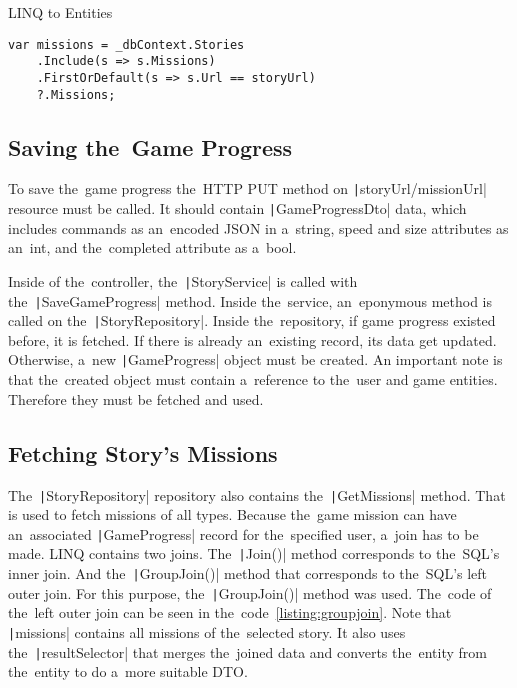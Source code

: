 \begin{listing}
    \caption{LINQ to Entities}
    \label{listing:linq}
    \begin{verbatim}
var missions = _dbContext.Stories
    .Include(s => s.Missions)
    .FirstOrDefault(s => s.Url == storyUrl)
    ?.Missions;
    \end{verbatim}
\end{listing}

\subsection{Saving the~Game Progress}

To save the~game progress the~HTTP PUT method on \linebreak\texttt|{storyUrl}/{missionUrl}| resource must be called.
It should contain \linebreak\texttt|GameProgressDto| data, which includes commands as an~encoded JSON in a~string, speed and size attributes as an~int, and the~completed attribute as a~bool.

Inside of the~controller, the~\texttt|StoryService| is called with the~\linebreak\texttt|SaveGameProgress| method.
Inside the~service, an~eponymous method is called on the~\texttt|StoryRepository|.
Inside the~repository, if game progress existed before, it is fetched.
If there is already an~existing record, its data get updated.
Otherwise, a~new \texttt|GameProgress| object must be created.
An important note is that the~created object must contain a~reference to the~user and game entities.
Therefore they must be fetched and used.

\subsection{Fetching Story's Missions}

The~\texttt|StoryRepository| repository also contains the~\texttt|GetMissions| method.
That is used to fetch missions of all types.
Because the~game mission can have an~associated \texttt|GameProgress| record for the~specified user, a~join has to be made.
LINQ contains two joins.
The~\texttt|Join()| method corresponds to the~SQL's inner join.
And the~\texttt|GroupJoin()| method that corresponds to the~SQL's left outer join.
For this purpose, the~\texttt|GroupJoin()| method was used.
The~code of the~left outer join can be seen in the~code~\ref{listing:groupjoin}.
Note that \texttt|missions| contains all missions of the~selected story.
It also uses the~\texttt|resultSelector| that merges the~joined data and converts the~entity from the~entity to do a~more suitable DTO.

